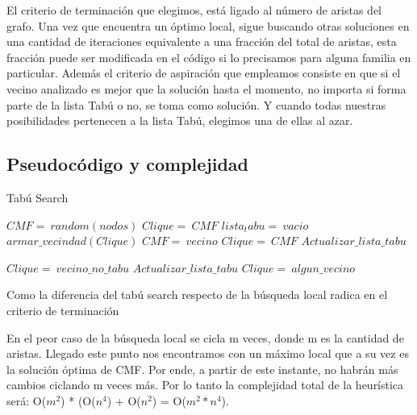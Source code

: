 El criterio de terminación que elegimos, está ligado al número de aristas del grafo. Una vez que encuentra un óptimo local, sigue buscando otras soluciones en una cantidad de iteraciones equivalente a una fracción del total de aristas, esta fracción puede ser modificada en el código si lo precisamos para alguna familia en particular.
Además el criterio de aspiración que empleamos consiste en que si el vecino analizado es mejor que la solución hasta el momento, no importa si forma parte de la lista Tabú o no, se toma como solución. Y cuando todas nuestras posibilidades pertenecen a la lista Tabú, elegimos una de ellas al azar.

\subsection{Pseudoc\'odigo y complejidad}

\begin{algorithm}[H]
	\caption{Tabú Search}\label{tabu}
	\begin{algorithmic}[1]
		\State $CMF=\ random(nodos)$	
		\State $Clique=\ CMF$
		\State $lista_tabu=\ vacio$
			\State $armar\_vecindad(Clique)$
				 
					\State $CMF=\ vecino$
					\State $Clique=\ CMF$ 
					\State $Actualizar\_lista\_tabu$
				\EndIf
			\EndFor
		\EndWhile

				\State $Clique=\ vecino\_no\_tabu$
				\State $Actualizar\_lista\_tabu$
			\Else
				\State $Clique=\ algun\_vecino$
			\EndIf
		\EndIf
	\EndProcedure
\end{algorithmic}
\end{algorithm}

Como la diferencia del tabú search respecto de la búsqueda local radica en el criterio de terminación

En el peor caso de la búsqueda local se cicla m veces, donde m es la cantidad de aristas. Llegado este punto nos encontramos con un máximo local que a su vez es la solución óptima de CMF. Por ende, a partir de este instante, no habrán más cambios ciclando m veces más. Por lo tanto la complejidad total de la heurística será: O($m^2$) * (O($n^4$) + O($n^2$) = O($m^2*n^4$).

